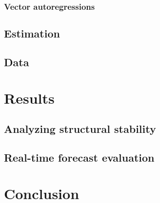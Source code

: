 \documentclass[notitlepage,a4paper,12pt]{article}
\begin{document}
\subsubsection{Vector autoregressions}

\subsection{Estimation}

\subsection{Data}

\section{Results}

\subsection{Analyzing structural stability}

\subsection{Real-time forecast evaluation}

\section{Conclusion}




\end{document}
